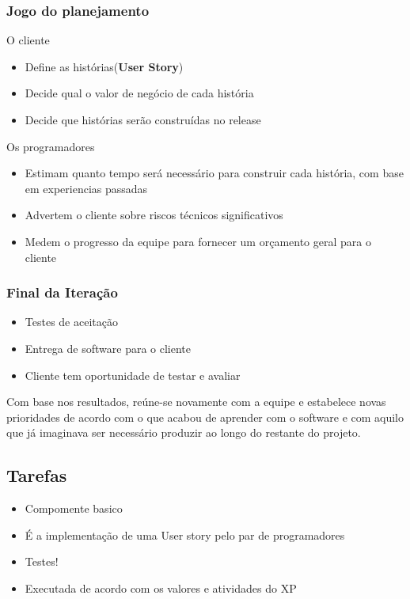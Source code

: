 \documentclass[10pt]{beamer}
\begin{document}
\begin{frame}
  \frametitle{Jogo do planejamento}
    \begin{block}{O cliente}
      \begin{itemize}%
        \item Define as histórias(\textbf{User Story})
        \item Decide qual o valor de negócio de cada história
        \item Decide que histórias serão construídas no release
      \end{itemize}
    \end{block}
    \pause
    \begin{block}{Os programadores}
      \begin{itemize}%
        \item Estimam quanto tempo será necessário para construir cada história, com base em experiencias passadas
        \item Advertem o cliente sobre riscos técnicos significativos
        \item Medem o progresso da equipe para fornecer um orçamento geral para o cliente
      \end{itemize}
    \end{block}
\end{frame}


\begin{frame}
  \frametitle{Final da Iteração}
  \begin{itemize}%
    \item Testes de aceitação
    \item Entrega de software para o cliente
    \item Cliente tem oportunidade de testar e avaliar
  \end{itemize}
  \begin{block}{}
Com base nos resultados, reúne-se novamente com a equipe e estabelece novas prioridades de acordo com o que acabou de aprender com o software e com aquilo que já imaginava ser necessário produzir ao longo do restante do projeto.
  \end{block}
\end{frame}



\subsection{Tarefas}
\begin{frame}
  \begin{itemize}
  \item Compomente basico
  \item É a implementação de uma User story pelo par de programadores
  \item Testes!
  \item Executada de acordo com os valores e atividades do XP
  \end{itemize}
\end{frame}
\end{document}
